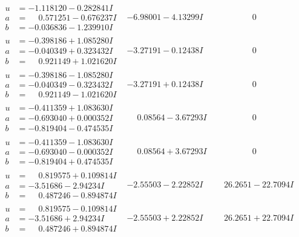 \documentclass[1p]{elsarticle_modified}
\theoremstyle{definition}
\begin{document}
$$\begin{array}{c|c|c}
\begin{aligned}
u &= -1.118120 - 0.282841 I \\
a &= \phantom{-}0.571251 - 0.676237 I \\
b &= -0.036836 - 1.239910 I\end{aligned}
 & -6.98001 - 4.13299 I & \phantom{-0.000000 } 0 \\ \hline\begin{aligned}
u &= -0.398186 + 1.085280 I \\
a &= -0.040349 + 0.323432 I \\
b &= \phantom{-}0.921149 + 1.021620 I\end{aligned}
 & -3.27191 - 0.12438 I & \phantom{-0.000000 } 0 \\ \hline\begin{aligned}
u &= -0.398186 - 1.085280 I \\
a &= -0.040349 - 0.323432 I \\
b &= \phantom{-}0.921149 - 1.021620 I\end{aligned}
 & -3.27191 + 0.12438 I & \phantom{-0.000000 } 0 \\ \hline\begin{aligned}
u &= -0.411359 + 1.083630 I \\
a &= -0.693040 + 0.000352 I \\
b &= -0.819404 - 0.474535 I\end{aligned}
 & \phantom{-}0.08564 - 3.67293 I & \phantom{-0.000000 } 0 \\ \hline\begin{aligned}
u &= -0.411359 - 1.083630 I \\
a &= -0.693040 - 0.000352 I \\
b &= -0.819404 + 0.474535 I\end{aligned}
 & \phantom{-}0.08564 + 3.67293 I & \phantom{-0.000000 } 0 \\ \hline\begin{aligned}
u &= \phantom{-}0.819575 + 0.109814 I \\
a &= -3.51686 - 2.94234 I \\
b &= \phantom{-}0.487246 - 0.894874 I\end{aligned}
 & -2.55503 - 2.22852 I & \phantom{-}26.2651 - 22.7094 I \\ \hline\begin{aligned}
u &= \phantom{-}0.819575 - 0.109814 I \\
a &= -3.51686 + 2.94234 I \\
b &= \phantom{-}0.487246 + 0.894874 I\end{aligned}
 & -2.55503 + 2.22852 I & \phantom{-}26.2651 + 22.7094 I \\ \hline\begin{aligned}

\end{aligned}
\end{array}$$
\end{document}
